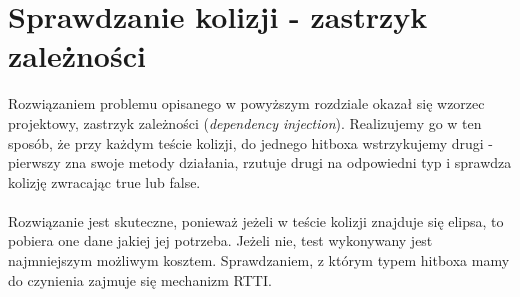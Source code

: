 	\section{Sprawdzanie kolizji - zastrzyk zależności}
		Rozwiązaniem problemu opisanego w powyższym rozdziale okazał się wzorzec projektowy, zastrzyk zależności (\emph{dependency injection}). Realizujemy go w ten sposób, że przy każdym teście kolizji, do jednego hitboxa wstrzykujemy drugi - pierwszy zna swoje metody działania, rzutuje drugi na odpowiedni typ i sprawdza kolizję zwracając true lub false.\\\\
		Rozwiązanie jest skuteczne, ponieważ jeżeli w teście kolizji znajduje się elipsa, to pobiera one dane jakiej jej potrzeba. Jeżeli nie, test wykonywany jest najmniejszym możliwym kosztem. Sprawdzaniem, z którym typem hitboxa mamy do czynienia zajmuje się mechanizm RTTI.